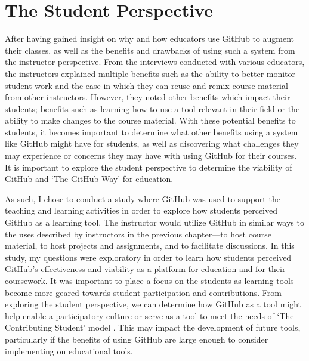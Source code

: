 








\chapter{The Student Perspective}

After having gained insight on why and how educators use GitHub to augment their classes, as well as the benefits and drawbacks of using such a system from the instructor perspective. From the interviews conducted with various educators, the instructors explained multiple benefits such as the ability to better monitor student work and the ease in which they can reuse and remix course material from other instructors. However, they noted other benefits which impact their students; benefits such as learning how to use a tool relevant in their field or the ability to make changes to the course material. With these potential benefits to students, it becomes important to determine what other benefits using a system like GitHub might have for students, as well as discovering what challenges they may experience or concerns they may have with using GitHub for their courses. It is important to explore the student perspective to determine the viability of GitHub and `The GitHub Way' for education.

As such, I chose to conduct a study where GitHub was used to support the teaching and learning activities in order to explore how students perceived GitHub as a learning tool. The instructor would utilize GitHub in similar ways to the uses described by instructors in the previous chapter---to host course material, to host projects and assignments, and to facilitate discussions. In this study, my questions were exploratory in order to learn how students perceived GitHub's effectiveness and viability as a platform for education and for their coursework. It was important to place a focus on the students as learning tools become more geared towards student participation and contributions. From exploring the student perspective, we can determine how GitHub as a tool might help enable a participatory culture \cite{jenkins2009confronting} or serve as a tool to meet the needs of `The Contributing Student' model \cite{hamer2008contributing}. This may impact the development of future tools, particularly if the benefits of using GitHub are large enough to consider implementing on educational tools.

